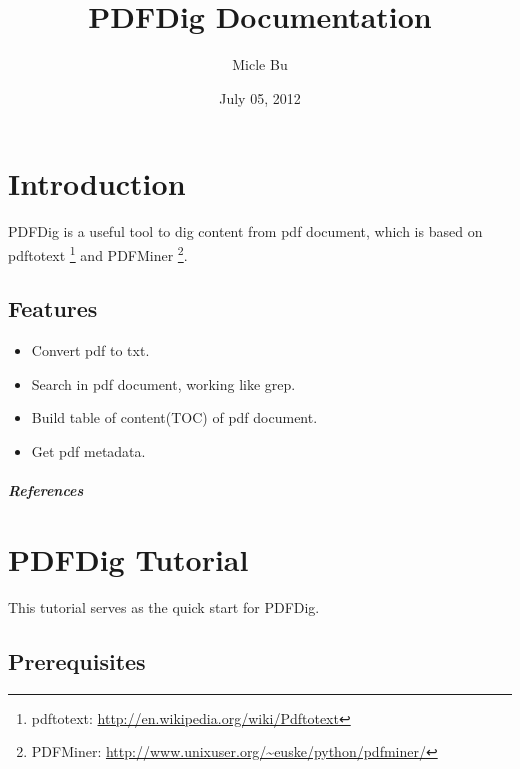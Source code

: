 \documentclass[letterpaper,10pt,oneside]{sphinxmanual}
\title{PDFDig Documentation}
\date{July 05, 2012}
\author{Micle Bu}
\begin{document}
\maketitle
\tableofcontents
{}\label{index::doc}\label{index:contents}



\chapter{Introduction}
\label{intro:introduction}\label{intro:pdfdig-documentation}\label{intro::doc}
PDFDig is a useful tool to dig content from pdf document, which is based on pdftotext \footnote{
pdftotext: \href{http://en.wikipedia.org/wiki/Pdftotext}{http://en.wikipedia.org/wiki/Pdftotext}
} and PDFMiner \footnote{
PDFMiner: \href{http://www.unixuser.org/~euske/python/pdfminer/}{http://www.unixuser.org/\textasciitilde{}euske/python/pdfminer/}
}.


\section{Features}
\label{intro:features}\begin{itemize}
\item {} 
Convert pdf to txt.

\item {} 
Search in pdf document, working like grep.

\item {} 
Build table of content(TOC) of pdf document.

\item {} 
Get pdf metadata.

\end{itemize}
\paragraph{References}


\chapter{PDFDig Tutorial}
\label{tutorial::doc}\label{tutorial:pdfdig-tutorial}
This tutorial serves as the quick start for PDFDig.


\section{Prerequisites}
\label{tutorial:prerequisites}
\end{document}

